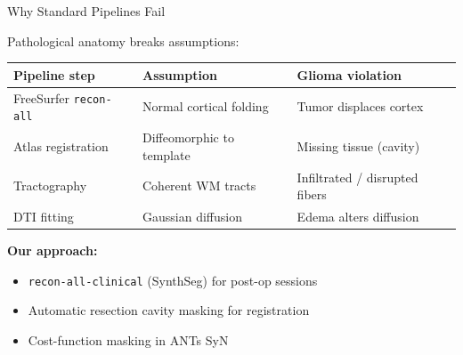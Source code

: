 \begin{frame}{Why Standard Pipelines Fail}

  Pathological anatomy breaks assumptions:

  \bigskip

  \begin{tabular}{lll}
    \toprule
    \textbf{Pipeline step} & \textbf{Assumption} & \textbf{Glioma violation} \\
    \midrule
    FreeSurfer \texttt{recon-all} & Normal cortical folding &
      Tumor displaces cortex \\
    Atlas registration & Diffeomorphic to template &
      Missing tissue (cavity) \\
    Tractography & Coherent WM tracts &
      Infiltrated / disrupted fibers \\
    DTI fitting & Gaussian diffusion &
      Edema alters diffusion \\
    \bottomrule
  \end{tabular}

  \bigskip

  \textbf{Our approach:}
  \begin{itemize}
    \item \texttt{recon-all-clinical} (SynthSeg) for post-op sessions
    \item Automatic resection cavity masking for registration
    \item Cost-function masking in ANTs SyN
  \end{itemize}

\end{frame}


